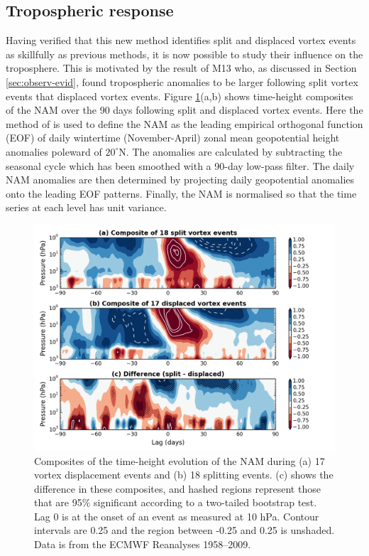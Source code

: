 \subsection{Tropospheric response}

Having verified that this new method identifies split and displaced vortex
events as skillfully as previous methods, it is now possible to study their
influence on the troposphere. This is motivated by the result of M13 who, as
discussed in Section \ref{sec:observ-evid}, found tropospheric anomalies to be
larger following split vortex events that displaced vortex events. Figure
\ref{fig:dripping_paint}(a,b) shows time-height composites of the NAM over the
90 days following split and displaced vortex events. Here the method of
\citet{Baldwin2009} is used to define the NAM as the leading empirical
orthogonal function (EOF) of daily wintertime (November-April) zonal mean
geopotential height anomalies poleward of $20^{\circ}$N. The anomalies are
calculated by subtracting the seasonal cycle which has been smoothed with a
90-day low-pass filter. The daily NAM anomalies are then determined by
projecting daily geopotential anomalies onto the leading EOF patterns. Finally,
the NAM is normalised so that the time series at each level has unit variance.

\begin{figure}
 \centering
 \noindent\includegraphics[width=\textwidth]{figures/chapter-moments/dripping_paint.png}
 \caption[NAM composites for split and displaced vortex events.]{Composites of
   the time-height evolution of the NAM during (a) 17 vortex displacement events
   and (b) 18 splitting events. (c) shows the difference in these composites,
   and hashed regions represent those that are 95\% significant according to a
   two-tailed bootstrap test. Lag 0 is at the onset of an event as measured at
   10 hPa. Contour intervals are 0.25 and the region between -0.25 and 0.25 is
   unshaded. Data is from the ECMWF Reanalyses 1958--2009.}
 \label{fig:dripping_paint}
\end{figure}


